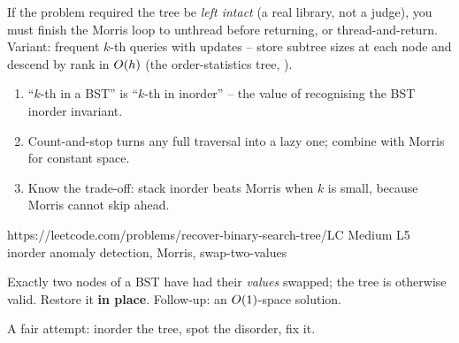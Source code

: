 \begin{warningbox}
If the problem required the tree be \emph{left intact} (a real library, not a judge), you
must finish the Morris loop to unthread before returning, or thread-and-return. Variant:
frequent $k$-th queries with updates -- store subtree sizes at each node and descend by
rank in $O(h)$ (the order-statistics tree, ).
\end{warningbox}

\begin{insightbox}
\begin{enumerate}[nosep, leftmargin=1.6em]
  \item ``$k$-th in a BST'' is ``$k$-th in inorder'' -- the value of recognising the BST
        inorder invariant.
  \item Count-and-stop turns any full traversal into a lazy one; combine with Morris for
        constant space.
  \item Know the trade-off: stack inorder beats Morris when $k$ is small, because Morris
        cannot skip ahead.
\end{enumerate}
\end{insightbox}

  {https://leetcode.com/problems/recover-binary-search-tree/}{LC Medium L5}
  {inorder anomaly detection, Morris, swap-two-values}

\begin{problemstatement}
Exactly two nodes of a BST have had their \emph{values} swapped; the tree is otherwise
valid. Restore it \textbf{in place}. Follow-up: an $O(1)$-space solution.
\end{problemstatement}

\begin{attemptgate}
A fair attempt: inorder the tree, spot the disorder, fix it.
\end{attemptgate}

